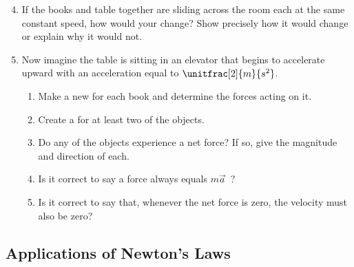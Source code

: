 \begin{enumerate}
	  \setcounter{enumi}{3}
	\item If the books and table together are sliding across the room each at the same constant speed, how would your \forcediags{} change? Show precisely how it would change or explain why it would not.
	
	\item Now imagine the table is sitting in an elevator that begins to accelerate upward with an acceleration equal to $\unitfrac[2]{m}{s^2}$.
	\begin{enumerate}
		\item Make a new \forcediag{} for each book and determine the forces acting on it.
		\item Create a \pchart{} for at least two of the objects.
		\item Do any of the objects experience a net force? If so, give the magnitude and direction of each.
		\item Is it correct to say a force always equals $m\vec{a}$~?
		\item Is it correct to say that, whenever the net force is zero, the velocity must also be zero?
	\end{enumerate}
\end{enumerate}

\WCD

\subsection{Applications of Newton's Laws}

\begin{fnt}
	
\end{fnt}

\vspace{-6pt}
\WCD
\vspace{12pt}

